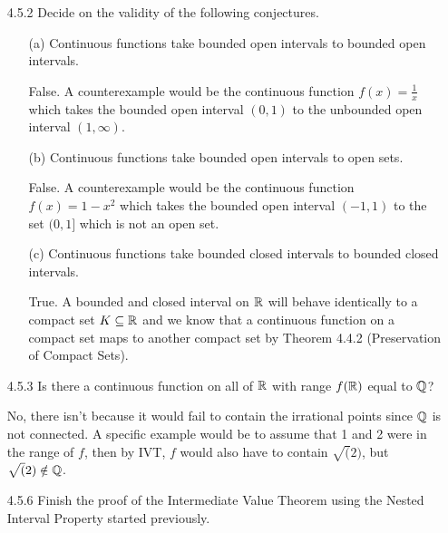 \documentclass[12pt,letterpaper]{article}
\begin{document}
\begin{itemize}[leftmargin=!,labelindent=5pt]
\begin{proof}
                Next, we need to show that if $g^{-1}(O)$ is open whenever $O \subseteq \bbR$ is an open set, then $g$ is continuous -- that is given an arbitrary point $c \in \bbR$, for all $V_\epsilon(g(c))$ there exists a $V_\delta(c)$ such that $x \in V_\delta(c)$ implies $g(x) \in V_\epsilon(g(c))$.
                Choose an arbitrary point $c \in \bbR$ and $\epsilon > 0$. 
                Let $O$ be the open set given by $V_\epsilon(g(c))$.
                This means that $g^{-1}(O)$ is open -- that is, there exists a $\delta > 0$ such that $V_\delta(c) \subseteq g^{-1}(O)$.
                Choose such a $\delta$.
                Then, for all $x \in V_\delta(c)$, $g(x) \in O$ which means $g(x) \in V_\epsilon(g(c))$ as desired.
                Thus, $g$ is continuous by Theorem 4.3.2 (iii) (Characterizations of Continuity).
            \end{proof}
        \newpage
        \item [4.5.2] Decide on the validity of the following conjectures.
            \begin{itemize}
                \item [(a)] Continuous functions take bounded open intervals to bounded open intervals.
                
                    False. A counterexample would be the continuous function $f(x) = \frac{1}{x}$ which takes the bounded open interval $(0,1)$ to the unbounded open interval $(1, \infty)$.
                \item [(b)] Continuous functions take bounded open intervals to open sets.

                    False. A counterexample would be the continuous function $f(x) = 1-x^2$ which takes the bounded open interval $(-1,1)$ to the set $(0, 1]$ which is not an open set.
                \item [(c)] Continuous functions take bounded closed intervals to bounded closed intervals.
                
                    True. A bounded and closed interval on $\mathbb{R}$ will behave identically to a compact set $K \subseteq \mathbb{R}$ and we know that a continuous function on a compact set maps to another compact set by Theorem 4.4.2 (Preservation of Compact Sets).
            \end{itemize}
        \item [4.5.3] Is there a continuous function on all of $\mathbb{R}$ with range $f(\mathbb{R})$ equal to $\mathbb{Q}$?
        
            No, there isn't because it would fail to contain the irrational points since $\mathbb{Q}$ is not connected. A specific example would be to assume that 1 and 2 were in the range of $f$, then by IVT, $f$ would also have to contain $\sqrt(2)$, but $\sqrt(2) \notin \mathbb{Q}$.
        \item [4.5.6] Finish the proof of the Intermediate Value Theorem using the Nested Interval Property started previously.
        

\end{itemize}
\end{document}
